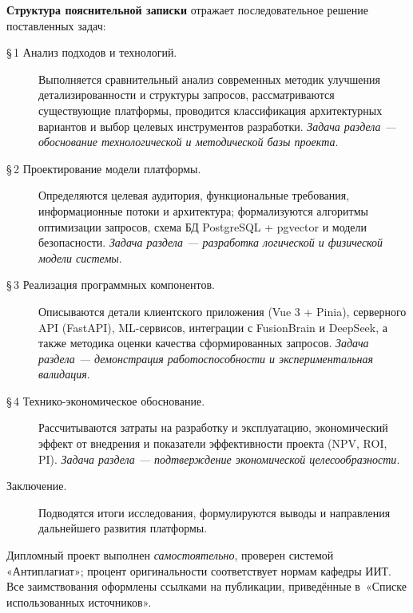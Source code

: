 \bigskip
\textbf{Структура пояснительной записки} отражает последовательное
решение поставленных задач:

\begin{description}
  \item[\S\,1 Анализ подходов и технологий.]
        Выполняется сравнительный анализ современных методик
        улучшения детализированности и структуры запросов,
        рассматриваются существующие платформы, проводится
        классификация архитектурных вариантов и выбор целевых
        инструментов разработки.  \emph{Задача раздела —
        обоснование технологической и методической базы проекта}.
  \item[\S\,2 Проектирование модели платформы.]
        Определяются целевая аудитория, функциональные требования,
        информационные потоки и архитектура; формализуются алгоритмы
        оптимизации запросов, схема БД PostgreSQL + pgvector и
        модели безопасности.  \emph{Задача раздела —
        разработка логической и физической модели системы}.
  \item[\S\,3 Реализация программных компонентов.]
        Описываются детали клиентского приложения (Vue 3 + Pinia),
        серверного API (FastAPI), ML-сервисов, интеграции с FusionBrain
        и DeepSeek, а также методика оценки качества сформированных
        запросов.  \emph{Задача раздела — демонстрация
        работоспособности и экспериментальная валидация}.
  \item[\S\,4 Технико-экономическое обоснование.]
        Рассчитываются затраты на разработку и эксплуатацию,
        экономический эффект от внедрения и показатели
        эффективности проекта (NPV, ROI, PI).  \emph{Задача раздела —
        подтверждение экономической целесообразности}.
  \item[Заключение.]
        Подводятся итоги исследования, формулируются выводы и
        направления дальнейшего развития платформы.
\end{description}

\bigskip
Дипломный проект выполнен \emph{самостоятельно}, проверен системой
«Антиплагиат»; процент оригинальности соответствует нормам кафедры ИИТ.
Все заимствования оформлены ссылками на публикации, приведённые
в~«Списке использованных источников».
